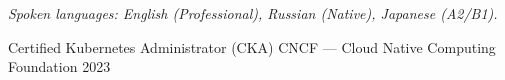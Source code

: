 \documentclass[10pt, a4paper]{awesome-cv}
\begin{document}
\vspace{2pt}
\textit{\small Spoken languages: English (Professional), Russian (Native), Japanese (A2/B1).}


\begin{cvhonors}
  \cvhonor
    {Certified Kubernetes Administrator (CKA)}
    {CNCF --- Cloud Native Computing Foundation}
    {}
    {2023}
\end{cvhonors}

\end{document}
